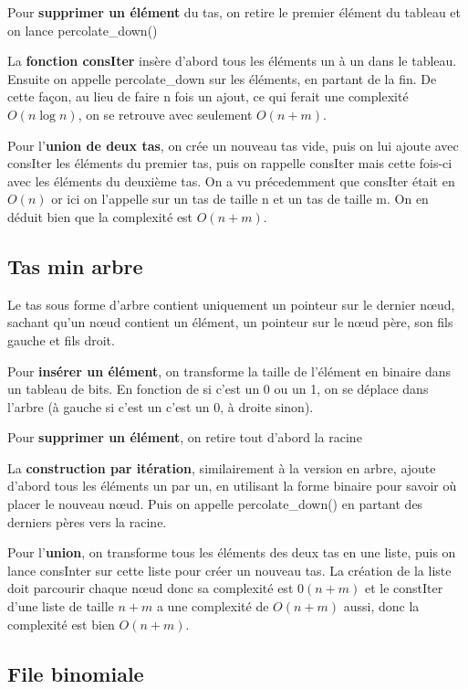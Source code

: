\documentclass{article}
\begin{document}
Pour \textbf{supprimer un élément} du tas, on retire le premier élément du tableau et on lance percolate\_down() %

La \textbf{fonction consIter} insère d’abord tous les éléments un à un dans le tableau. Ensuite on appelle percolate\_down sur les éléments, en partant de la fin. %
De cette façon, au lieu de faire n fois un ajout, ce qui ferait une complexité $O(n\log{}n)$, on se retrouve avec seulement $O(n+m)$.

Pour l'\textbf{union de deux tas}, on crée un nouveau tas vide, puis on lui ajoute avec consIter les éléments du premier tas, puis on rappelle consIter mais cette fois-ci avec les éléments du deuxième tas. On a vu précedemment que consIter était en $O(n)$ or ici on l’appelle sur un tas de taille n et un tas de taille m. On en déduit bien que la complexité est $O(n+m)$.


\subsection{Tas min arbre}
Le tas sous forme d’arbre contient uniquement un pointeur sur le dernier nœud, sachant qu’un nœud contient un élément, un pointeur sur le nœud père, son fils gauche et fils droit.

Pour \textbf{insérer un élément}, on transforme la taille de l’élément en binaire dans un tableau de bits. En fonction de si c’est un 0 ou un 1, on se déplace dans l’arbre (à gauche si c’est un c’est un 0, à droite sinon).

Pour \textbf{supprimer un élément}, on retire tout d’abord la racine %

La \textbf{construction par itération}, similairement à la version en arbre, ajoute d’abord tous les éléments un par un, en utilisant la forme binaire pour savoir où placer le nouveau nœud. Puis on appelle  percolate\_down() en partant des derniers pères vers la racine.

Pour l’\textbf{union}, on transforme tous les éléments des deux tas en une liste, puis on lance consInter sur cette liste pour créer un nouveau tas. La création de la liste doit parcourir chaque nœud donc sa complexité est $0(n+m)$ et le constIter d’une liste de taille $n+m$ a une complexité de $O(n+m)$ aussi, donc la complexité est bien $O(n+m)$.


\subsection{File binomiale}
\end{document}
